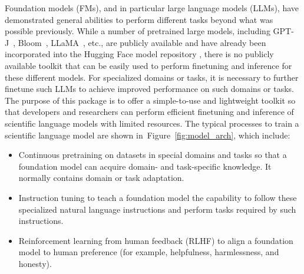 \documentclass[11pt]{article}
\begin{document}
Foundation models (FMs), and in particular large language models (LLMs), have demonstrated general abilities to perform different tasks beyond what was possible previously. 
While a number of pretrained large models, including GPT-J~\citep{gpt-j}, Bloom~\citep{scao2022bloom}, LLaMA~\citep{touvron2023llama, touvron2023llama2}, etc., are publicly available and have already been incorporated into the Hugging Face model repository \citep{huggingface}, there is no publicly available toolkit that can be easily used to perform finetuning and inference for these different models. 
For specialized domains or tasks, it is necessary to further finetune such LLMs to achieve improved performance on such domains or tasks. 
The purpose of this package is to offer a simple-to-use and lightweight toolkit so that developers and researchers can perform efficient finetuning and inference of scientific language models with limited resources. 
The typical processes to train a scientific language model are shown in~Figure~\ref{fig:model_arch}, which include: 
\begin{itemize}
[leftmargin=*,label=$\bullet$,noitemsep,partopsep=0pt,topsep=0pt,parsep=0pt]
    \item Continuous pretraining on datasets in special domains and tasks so that a foundation model can acquire domain- and task-specific knowledge.
    It normally contains domain or task adaptation.
    \item Instruction tuning to teach a foundation model the capability to follow these specialized natural language instructions and perform tasks required by such instructions. 
    \item Reinforcement learning from human feedback (RLHF) to align a foundation model to human preference (for example, helpfulness, harmlessness, and honesty). 
\end{itemize}
\end{document}
